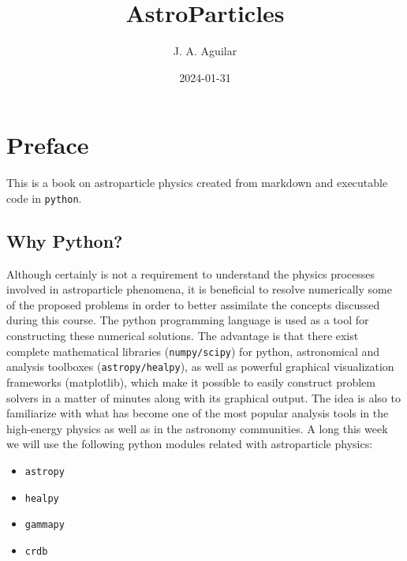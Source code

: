 \documentclass[
  letterpaper,
  DIV=11,
  numbers=noendperiod]{scrreprt}
\title{AstroParticles}
\author{J. A. Aguilar}
\date{2024-01-31}
\providecommand{\tightlist}{%
  \setlength{\itemsep}{0pt}\setlength{\parskip}{0pt}}\usepackage{longtable,booktabs,array}
\renewcommand*\contentsname{Table of contents}
\newcommand\contentsname{Table of contents}
\begin{document}
\maketitle

\renewcommand*\contentsname{Table of contents}
{
\hypersetup{linkcolor=}
\setcounter{tocdepth}{2}
\tableofcontents
}

\chapter*{Preface}\label{preface}


This is a book on astroparticle physics created from markdown and
executable code in \texttt{python}.

\section*{Why Python?}\label{why-python}


Although certainly is not a requirement to understand the physics
processes involved in astroparticle phenomena, it is beneficial to
resolve numerically some of the proposed problems in order to better
assimilate the concepts discussed during this course. The python
programming language is used as a tool for constructing these numerical
solutions. The advantage is that there exist complete mathematical
libraries (\texttt{numpy/scipy}) for python, astronomical and analysis
toolboxes (\texttt{astropy/healpy}), as well as powerful graphical
visualization frameworks (matplotlib), which make it possible to easily
construct problem solvers in a matter of minutes along with its
graphical output. The idea is also to familiarize with what has become
one of the most popular analysis tools in the high-energy physics as
well as in the astronomy communities. A long this week we will use the
following python modules related with astroparticle physics:

\begin{itemize}
\tightlist
\item
  \texttt{astropy}
\item
  \texttt{healpy}
\item
  \texttt{gammapy}
\item
  \texttt{crdb}
\end{itemize}
\end{document}
